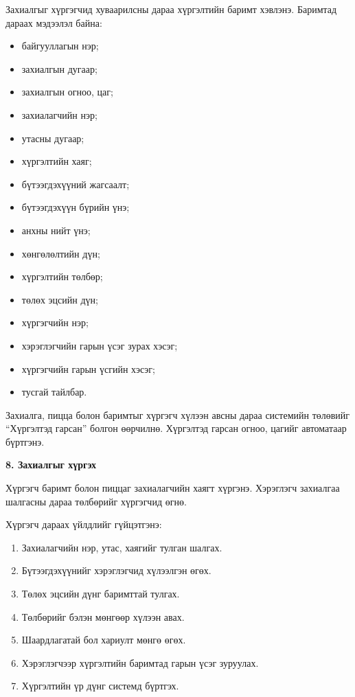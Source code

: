 Захиалгыг хүргэгчид хуваарилсны дараа хүргэлтийн баримт хэвлэнэ. Баримтад дараах мэдээлэл байна:

\begin{itemize}
    \item байгууллагын нэр;
    \item захиалгын дугаар;
    \item захиалгын огноо, цаг;
    \item захиалагчийн нэр;
    \item утасны дугаар;
    \item хүргэлтийн хаяг;
    \item бүтээгдэхүүний жагсаалт;
    \item бүтээгдэхүүн бүрийн үнэ;
    \item анхны нийт үнэ;
    \item хөнгөлөлтийн дүн;
    \item хүргэлтийн төлбөр;
    \item төлөх эцсийн дүн;
    \item хүргэгчийн нэр;
    \item хэрэглэгчийн гарын үсэг зурах хэсэг;
    \item хүргэгчийн гарын үсгийн хэсэг;
    \item тусгай тайлбар.
\end{itemize}

Захиалга, пицца болон баримтыг хүргэгч хүлээн авсны дараа системийн төлөвийг “Хүргэлтэд гарсан” болгон өөрчилнө. Хүргэлтэд гарсан огноо, цагийг автоматаар бүртгэнэ.

\textbf{8. Захиалгыг хүргэх}

Хүргэгч баримт болон пиццаг захиалагчийн хаягт хүргэнэ. Хэрэглэгч захиалгаа шалгасны дараа төлбөрийг хүргэгчид өгнө.

Хүргэгч дараах үйлдлийг гүйцэтгэнэ:

\begin{enumerate}
    \item Захиалагчийн нэр, утас, хаягийг тулган шалгах.
    \item Бүтээгдэхүүнийг хэрэглэгчид хүлээлгэн өгөх.
    \item Төлөх эцсийн дүнг баримттай тулгах.
    \item Төлбөрийг бэлэн мөнгөөр хүлээн авах.
    \item Шаардлагатай бол хариулт мөнгө өгөх.
    \item Хэрэглэгчээр хүргэлтийн баримтад гарын үсэг зуруулах.
    \item Хүргэлтийн үр дүнг системд бүртгэх.
\end{enumerate}

